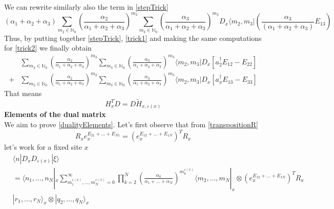 \documentclass[11pt]{article}
\numberwithin{equation}{subsection}
\begin{document}
We can rewrite similarly also the term in \eqref{stepTrick}
\begin{equation}\label{trick2}
    (\alpha_{1}+\alpha_{2}+\alpha_{3})\sum_{m_{2}\in\mathbb{N}_{0}}	\left(\frac{\alpha_{2}}{\alpha_{1}+\alpha_{2}+\alpha_{3}}\right)^{m_{2}}\sum_{m_{3}\in \mathbb{N}_{0}}\left(\frac{\alpha_{3}}{\alpha_{1}+\alpha_{2}+\alpha_{3}}\right)^{m_{2}}D_{x}\langle m_{2},m_{3}|\left(\frac{\alpha_{3}}{(\alpha_{1}+\alpha_{2}+\alpha_{3})}E_{13}\right)
\end{equation}
Thus, by putting together \eqref{stepTrick}, \eqref{trick1} and making the same computations for \eqref{trick2} we finally obtain
\begin{equation}
\begin{split}
&\sum_{m_{2}\in\mathbb{N}_{0}}	\left(\frac{\alpha_{2}}{\alpha_{1}+\alpha_{2}+\alpha_{3}}\right)^{m_{2}}\sum_{m_{3}\in \mathbb{N}_{0}}\left(\frac{\alpha_{3}}{\alpha_{1}+\alpha_{2}+\alpha_{3}}\right)^{m_{3}}\langle m_{2},m_{3}|D_{x}\left[a_{2}^{\dagger}E_{12}-E_{22}\right]\\ +&
\sum_{m_{2}\in\mathbb{N}_{0}}	\left(\frac{\alpha_{2}}{\alpha_{1}+\alpha_{2}+\alpha_{3}}\right)^{m_{2}}\sum_{m_{3}\in \mathbb{N}_{0}}\left(\frac{\alpha_{3}}{\alpha_{1}+\alpha_{2}+\alpha_{3}}\right)^{m_{3}}\langle m_{2},m_{3}|D_{x}\left[a_{x}^{\dagger}E_{13}-E_{33}\right]
\end{split}
\end{equation}
That means 
\begin{equation}
	H^{T}_{x}D=D\widetilde{H}_{x,\varepsilon(x)}
\end{equation}
\textbf{Elements of the dual matrix}\\
We aim to prove \eqref{dualityElements}. Let's first observe that from \eqref{transpositionR}
\begin{equation}
R_{x}e_{x}^{E_{21}+\ldots+E_{N1}}=(e^{E_{12}+\ldots+E_{1N}}_{x})^{T}R_{x}
\end{equation}
let's work for a fixed site $x$
\begin{align*}
	 &\langle n|D_{x}D_{\varepsilon(x)}|\xi\rangle\\&=\langle n_{1},\ldots,n_{N}|_{x}\sum_{m_{1}^{\varepsilon(x)},\ldots,m_{N}^{\varepsilon(x)}=0}^{\infty}\prod_{k=2}^{N}\left(\frac{\alpha_{k}}{\alpha_{1}+\ldots+\alpha_{N}}\right)^{m_{k}^{\varepsilon(x)}}\langle m_{2},\ldots,m_{N}|_{x}
	 \otimes(e_{x}^{E_{12}+\ldots+E_{1N}})^{T}R_{x}\\&|r_{1},\ldots,r_{N}\rangle_{x} \otimes |q_{2},\ldots,q_{N}\rangle_{x}
\end{align*}
\end{document}
